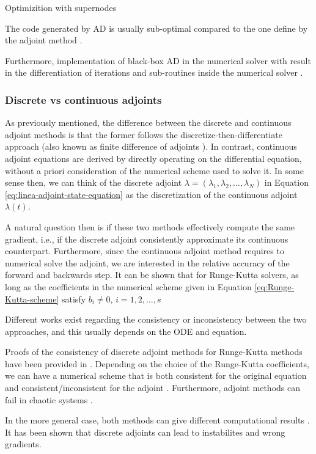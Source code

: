 
Optimizition with supernodes \cite{Margossian_2018}

The code generated by AD is usually sub-optimal compared to the one define by the adjoint method \cite{Alexe_Sandu_2009}.

Furthermore, implementation of black-box AD in the numerical solver with result in the differentiation of iterations and sub-routines inside the numerical solver \cite{Alexe_Sandu_2009}. 

\subsubsection{Discrete vs continuous adjoints}

As previously mentioned, the difference between the discrete and continuous adjoint methods is that the former follows the discretize-then-differentiate approach (also known as finite difference of adjoints \cite{Sirkes_Tziperman_1997}).
In contrast, continuous adjoint equations are derived by directly operating on the differential equation, without a priori consideration of the numerical scheme used to solve it. 
In some sense then, we can think of the discrete adjoint $\lambda = (\lambda_1, \lambda_2, \ldots, \lambda_N)$ in Equation \eqref{eq:linea-adjoint-state-equation} as the discretization of the continuous adjoint $\lambda(t)$. 

A natural question then is if these two methods effectively compute the same gradient, i.e., if the discrete adjoint consistently approximate its continuous counterpart. 
Furthermore, since the continuous adjoint method requires to numerical solve the adjoint, we are interested in the relative accuracy of the forward and backwards step. 
It can be shown that for Runge-Kutta solvers, as long as the coefficients in the numerical scheme given in Equation \eqref{eq:Runge-Kutta-scheme} satisfy $b_i \neq 0$, $i=1,2, \ldots, s$

Different works exist regarding the consistency or inconsistency between the two approaches, and this usually depends on the ODE and equation.  

Proofs of the consistency of discrete adjoint methods for Runge-Kutta methods have been provided in \cite{sandu2006properties, sandu2011solution}.
Depending on the choice of the Runge-Kutta coefficients, we can have a numerical scheme that is both consistent for the original equation and consistent/inconsistent for the adjoint \cite{Hager_2000}.
Furthermore, adjoint methods can fail in chaotic systems \cite{Wang2012-chaos-adjoint}.

In the more general case, both methods can give different computational results \cite{Sirkes_Tziperman_1997}.
It has been shown \cite{Sirkes_Tziperman_1997} that discrete adjoints can lead to instabilites and wrong gradients.